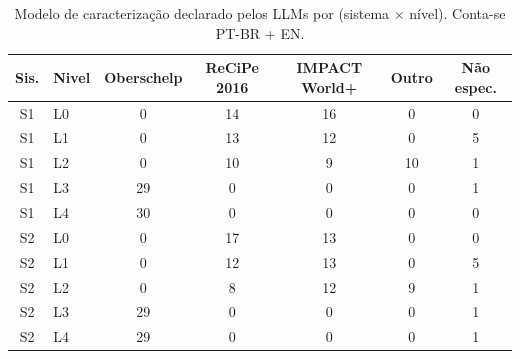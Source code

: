 \begin{table}[h]
\centering
\small
\caption{Modelo de caracteriza\c{c}\~ao declarado pelos LLMs por (sistema $\times$ n\'ivel). Conta-se PT-BR + EN.}
\label{tab:sm_char_choice}
\begin{tabular}{clccccc}
\toprule
\textbf{Sis.} & \textbf{Nivel} & \textbf{Oberschelp} & \textbf{ReCiPe 2016} & \textbf{IMPACT World+} & \textbf{Outro} & \textbf{N\~ao espec.} \\
\midrule
S1 & L0 & 0 & 14 & 16 & 0 & 0 \\
S1 & L1 & 0 & 13 & 12 & 0 & 5 \\
S1 & L2 & 0 & 10 & 9 & 10 & 1 \\
S1 & L3 & 29 & 0 & 0 & 0 & 1 \\
S1 & L4 & 30 & 0 & 0 & 0 & 0 \\
\midrule
S2 & L0 & 0 & 17 & 13 & 0 & 0 \\
S2 & L1 & 0 & 12 & 13 & 0 & 5 \\
S2 & L2 & 0 & 8 & 12 & 9 & 1 \\
S2 & L3 & 29 & 0 & 0 & 0 & 1 \\
S2 & L4 & 29 & 0 & 0 & 0 & 1 \\
\bottomrule
\end{tabular}
\end{table}
